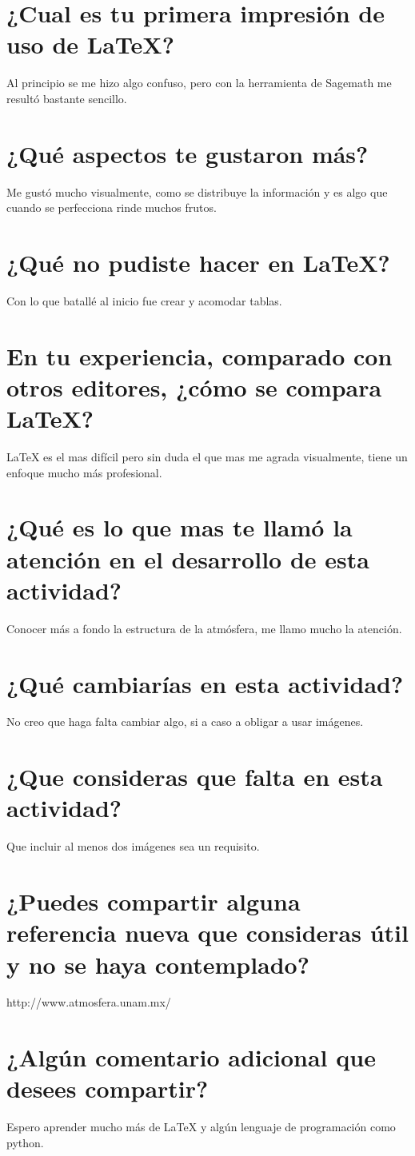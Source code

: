 \documentclass{article}
\begin{document}
\section{¿Cual es tu primera impresión de uso de LaTeX?}
Al principio se me hizo algo confuso, pero con la herramienta de Sagemath me resultó bastante sencillo.

\section{¿Qué aspectos te gustaron más?}
Me gustó mucho visualmente, como se distribuye la información y es algo que cuando se perfecciona rinde muchos frutos.

\section{¿Qué no pudiste hacer en LaTeX?}
Con lo que batallé al inicio fue crear y acomodar tablas.

\section{En tu experiencia, comparado con otros editores, ¿cómo se compara LaTeX?}
LaTeX es el mas difícil pero sin duda el que mas me agrada visualmente, tiene un enfoque mucho más profesional.

\section{¿Qué es lo que mas te llamó la atención en el desarrollo de esta actividad?}
Conocer más a fondo la estructura de la atmósfera, me llamo mucho la atención.

\section{¿Qué cambiarías en esta actividad?}
No creo que haga falta cambiar algo, si a caso a obligar a usar imágenes.

\section{¿Que consideras que falta en esta actividad?}
Que incluir al menos dos imágenes sea un requisito.

\section{¿Puedes compartir alguna referencia nueva que consideras útil y no se haya contemplado?}
http://www.atmosfera.unam.mx/

\section{¿Algún comentario adicional que desees compartir?}
Espero aprender mucho más de LaTeX y algún lenguaje de programación como python.
\end{document}
